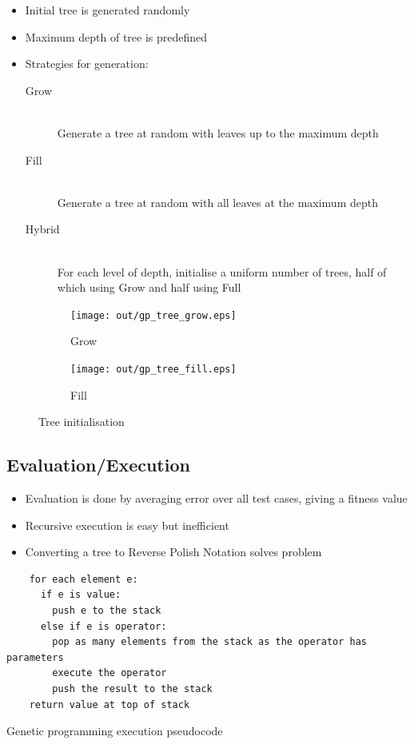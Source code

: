 \documentclass[a4paper]{article}
\begin{document}
\begin{itemize}
  \item Initial tree is generated randomly
  \item Maximum depth of tree is predefined
  \item Strategies for generation:
    \begin{description}
      \item[Grow] \hfill \\
        Generate a tree at random with leaves up to the maximum depth
      \item[Fill] \hfill \\
        Generate a tree at random with all leaves at the maximum depth
      \item[Hybrid] \hfill \\
        For each level of depth, initialise a uniform number of trees, half of
        which using Grow and half using Full
    \end{description}
\end{itemize}

\begin{figure}[h]
  \centering
  \begin{subfigure}[t!]{0.4\textwidth}
    \texttt{[image: out/gp\_tree\_grow.eps]}
    \caption{Grow}
  \end{subfigure}
  \begin{subfigure}[t!]{0.4\textwidth}
    \texttt{[image: out/gp\_tree\_fill.eps]}
    \caption{Fill}
  \end{subfigure}
  \caption{Tree initialisation}
  \label{fig:gp_initialisation}
\end{figure}
\FloatBarrier

\subsection{Evaluation/Execution}

\begin{itemize}
  \item Evaluation is done by averaging error over all test cases, giving a
        fitness value
  \item Recursive execution is easy but inefficient
  \item Converting a tree to Reverse Polish Notation solves problem
\end{itemize}

\begin{listing}[h]
  \begin{verbatim}
    for each element e:
      if e is value:
        push e to the stack
      else if e is operator:
        pop as many elements from the stack as the operator has parameters
        execute the operator
        push the result to the stack
    return value at top of stack
  \end{verbatim}
  \caption{Genetic programming execution pseudocode}
  \label{listing:gp_eval_pseudocode}
\end{listing}
\end{document}
